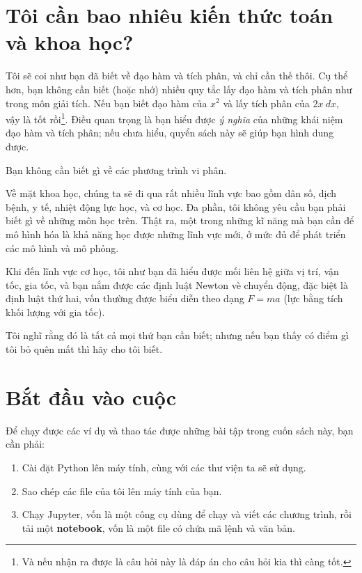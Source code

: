 \documentclass[12pt]{book}
\theoremstyle{exercise}
\begin{document}
\section{Tôi cần bao nhiêu kiến thức toán và khoa học?} 

Tôi sẽ coi như bạn đã biết về đạo hàm và tích phân, và chỉ cần thế thôi. Cụ thể hơn, bạn không cần biết (hoặc nhớ) nhiều quy tắc lấy đạo hàm và tích phân như trong môn giải tích. Nếu bạn biết đạo hàm của $x^2$ và lấy tích phân của $2x~dx$, vậy là tốt rồi\footnote{Và nếu nhận ra được là câu hỏi này là đáp án cho câu hỏi kia thì càng tốt.}.  Điều quan trọng là bạn hiểu được {\em ý nghĩa} của những khái niệm đạo hàm và tích phân; nếu chưa hiểu, quyển sách này sẽ giúp bạn hình dung được.


Bạn không cần biết gì về các phương trình vi phân.

Về mặt khoa học, chúng ta sẽ đi qua rất nhiều lĩnh vực bao gồm dân số, dịch bệnh, y tế, nhiệt động lực học, và cơ học. Đa phần, tôi không yêu cầu bạn phải biết gì về những môn học trên. Thật ra, một trong những kĩ năng mà bạn cần để mô hình hóa là khả năng học được những lĩnh vực mới, ở mức đủ để phát triển các mô hình và mô phỏng.

Khi đến lĩnh vực cơ học, tôi như bạn đã hiểu được mối liên hệ giữa vị trí, vận tốc, gia tốc, và bạn nắm được các định luật Newton vè chuyển động, đặc biệt là định luật thứ hai, vốn thường được biểu diễn theo dạng $F = ma$ (lực bằng tích khối lượng với gia tốc).


Tôi nghĩ rằng đó là tất cả mọi thứ bạn cần biết; nhưng nếu bạn thấy có điểm gì tôi bỏ quên mất thì hãy cho tôi biết.


\section{Bắt đầu vào cuộc}
\label{code}

Để chạy được các ví dụ và thao tác được những bài tập trong cuốn sách này, bạn cần phải:

\begin{enumerate}

\item Cài đặt Python lên máy tính, cùng với các thư viện ta sẽ sử dụng.

\item Sao chép các file của tôi lên máy tính của bạn.

\item Chạy Jupyter, vốn là một công cụ dùng để chạy và viết các chương trình, rồi tải một {\bf notebook}, vốn là một file có chứa mã lệnh và văn bản.

\end{enumerate}
\end{document}
